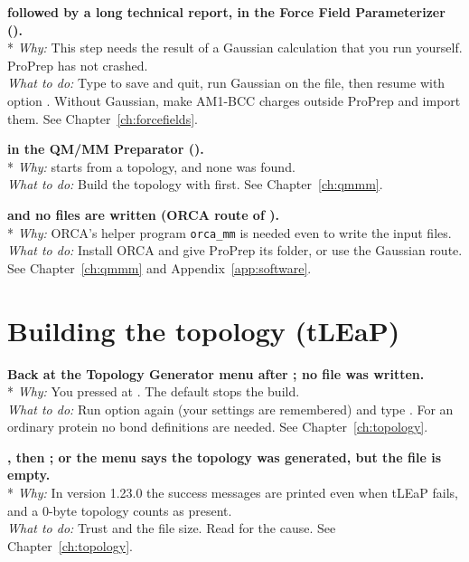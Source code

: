 {\bfseries {}
followed by a long technical report, in the Force Field Parameterizer
().}\\*
\emph{Why:} This step needs the result of a Gaussian calculation that you run
yourself. ProPrep has not crashed.\\
\emph{What to do:} Type  to save and quit, run Gaussian on the
 file, then resume with  option . Without Gaussian,
make AM1-BCC charges outside ProPrep and import them. See
Chapter~\ref{ch:forcefields}.

{\bfseries {} in the
QM/MM Preparator ().}\\*
\emph{Why:}  starts from a topology, and none was found.\\
\emph{What to do:} Build the topology with  first. See
Chapter~\ref{ch:qmmm}.

{\bfseries {}
and no files are written (ORCA route of ).}\\*
\emph{Why:} ORCA's helper program \texttt{orca\_mm} is needed even to write the
input files.\\
\emph{What to do:} Install ORCA and give ProPrep its folder, or use the
Gaussian route. See Chapter~\ref{ch:qmmm} and Appendix~\ref{app:software}.

\section{Building the topology (tLEaP)}\label{sec:troubleshooting-topology}

{\bfseries Back at the Topology Generator menu after ; no  file was written.}\\*
\emph{Why:} You pressed  at . The default  stops the build.\\
\emph{What to do:} Run  option  again (your settings are
remembered) and type . For an ordinary protein no bond definitions are
needed. See Chapter~\ref{ch:topology}.

{\bfseries {}, then ;
or the menu says the topology was generated, but the  file is
empty.}\\*
\emph{Why:} In version 1.23.0 the success messages are printed even when
tLEaP fails, and a 0-byte topology counts as present.\\
\emph{What to do:} Trust  and the file size. Read
 for the cause. See Chapter~\ref{ch:topology}.

